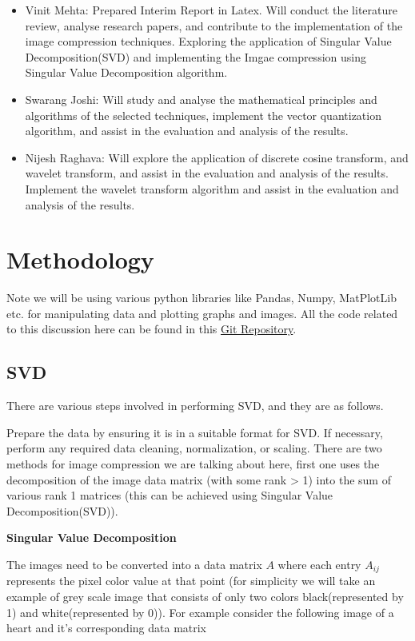 \documentclass{article}
\begin{document}
\begin{itemize}
    \item Vinit Mehta: Prepared Interim Report in Latex. Will conduct the literature review, analyse research papers, and contribute to the implementation of the image compression techniques. Exploring the application of Singular Value Decomposition(SVD) and implementing the Imgae compression using Singular Value Decomposition algorithm.
    \item Swarang Joshi: Will study and analyse the mathematical principles and algorithms of the selected techniques, implement the vector quantization algorithm, and assist in the evaluation and analysis of the results.
    \item Nijesh Raghava: Will explore the application of discrete cosine transform, and wavelet transform, and assist in the evaluation and analysis of the results. Implement the wavelet transform algorithm and assist in the evaluation and analysis of the results.
\end{itemize}

\section{Methodology}
Note we will be using various python libraries like Pandas, Numpy, MatPlotLib etc. for manipulating data and plotting graphs and images. All the code related to this discussion here can be found in this \href{https://github.com/Vinit2244/LA-Project-25.git}{Git Repository}.
\subsection{SVD}

There are various steps involved in performing SVD, and they are as follows.

Prepare the data by ensuring it is in a suitable format for SVD. If necessary, perform any required data cleaning, normalization, or scaling. There are two methods for image compression we are talking about here, first one uses the decomposition of the image data matrix (with some rank \textgreater{} 1) into the sum of various rank 1 matrices (this can be achieved using Singular Value Decomposition(SVD)).\\

\begin{center}
  \large\textbf{Singular Value Decomposition}
\end{center}

The images need to be converted into a data matrix $A$ where each entry $A_{ij}$ represents the pixel color value at that point (for simplicity we will take an example of grey scale image that consists of only two colors black(represented by 1) and white(represented by 0)). For example consider the following image of a heart and it's corresponding data matrix\\
\end{document}
